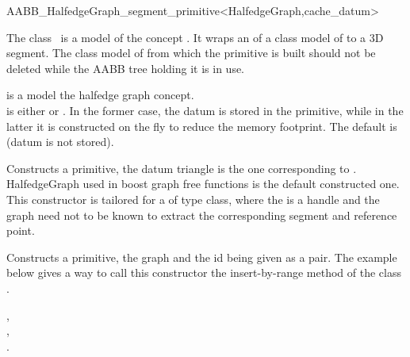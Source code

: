 \ccRefPageBegin

\begin{ccRefClass}{AABB_HalfedgeGraph_segment_primitive<HalfedgeGraph,cache_datum>}

\ccDefinition
  
The class \ccRefName\ is a model of the concept .
It wraps an  of a class model of  to a 3D segment.
The class model of  from which the primitive is built should not be deleted
while the AABB tree holding it is in use.



\ccParameters
{} is a model the halfedge graph concept.\\
 is either  or . In the former case, the datum is stored in the primitive, while in the latter it is constructed on the fly to reduce
the memory footprint. The default is  (datum is not stored).


\ccTypes
{}
\ccGlue
{}
\ccGlue
{}

\ccCreation
{}

{Constructs a primitive, the datum triangle is the one corresponding to .
HalfedgeGraph used in boost graph free functions is the default constructed one. This constructor is tailored for a 
of type  class, where the  is a handle and the graph need not to be known to extract
the corresponding segment and reference point.}

{Constructs a primitive, the graph and the id being given as a pair. The example below gives a way to call this constructor the insert-by-range method of the class .}


\ccSeeAlso

,\\
,\\
.\\


\end{ccRefClass}

\ccRefPageEnd

